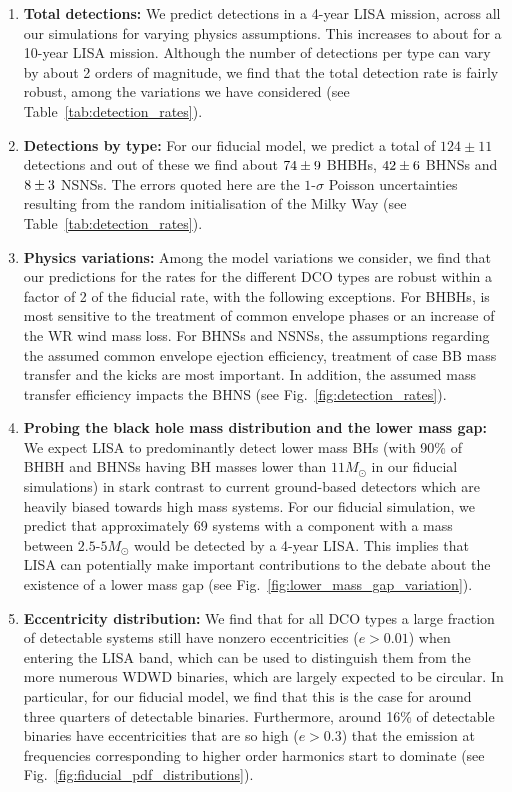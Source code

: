 \begin{enumerate}
    \item \textbf{Total detections:} We predict \rangeFourYear{} detections in a 4-year LISA mission, across all our simulations for varying physics assumptions. This increases to about \rangeTenYear{} for a 10-year LISA mission. Although the number of detections per type can vary by about 2 orders of magnitude, we find that the total detection rate is fairly robust, among the variations we have considered (see Table~\ref{tab:detection_rates}).
    
    \item \textbf{Detections by type:} For our fiducial model, we predict a total of $124 \pm 11$ detections and out of these we find about $74{}\pm 9$ BHBHs, $42{}\pm 6$ BHNSs and $8{}\pm 3$ NSNSs. The errors quoted here are the $1$-$\sigma$ Poisson uncertainties resulting from the random initialisation of the Milky Way (see Table~\ref{tab:detection_rates}).
    
    \item \textbf{Physics variations:}   Among the model variations we consider, we find that our predictions for the rates for the different DCO types are robust within a factor of 2 of the fiducial rate, with the following exceptions. For BHBHs, is most sensitive to the treatment of common envelope phases or an increase of the WR wind mass loss. For BHNSs and NSNSs, the assumptions regarding the assumed common envelope ejection efficiency, treatment of case BB mass transfer and the kicks are most important. In addition, the assumed mass transfer efficiency impacts the BHNS (see Fig.~\ref{fig:detection_rates}).
    
    \item \textbf{Probing the black hole mass distribution and the lower mass gap:} We expect LISA to predominantly detect lower mass BHs (with 90\% of BHBH and BHNSs having BH masses lower than $11 \unit{M_\odot}$ in our fiducial simulations) in stark contrast to current ground-based detectors which are heavily biased towards high mass systems. For our fiducial simulation, we predict that approximately 69 systems with a component with a mass between $2.5$-$5 \unit{M_\odot}$ would be detected by a 4-year LISA. This implies that LISA can potentially make important contributions to the debate about the existence of a lower mass gap (see Fig.~\ref{fig:lower_mass_gap_variation}).
    
    \item \textbf{Eccentricity distribution:} We find that for all DCO types a large fraction of detectable systems still have nonzero eccentricities ($e > 0.01$) when entering the LISA band, which can be used to distinguish them from the more numerous WDWD binaries, which are largely expected to be circular. In particular, for our fiducial model, we find that this is the case for around three quarters of detectable binaries. Furthermore, around 16\% of detectable binaries have eccentricities that are so high ($e > 0.3$) that the emission at frequencies corresponding to higher order harmonics start to dominate (see Fig.~\ref{fig:fiducial_pdf_distributions}).
    

\end{enumerate}
